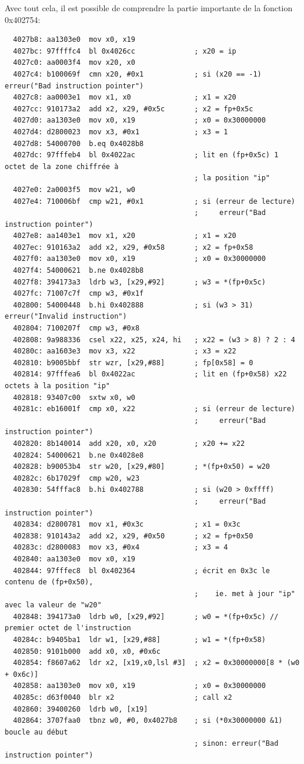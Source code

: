 \documentclass[a4paper,10pt]{article}
\begin{document}
Avec tout cela, il est possible de comprendre la partie importante de la fonction 0x402754:
\begin{verbatim}
  4027b8: aa1303e0  mov x0, x19
  4027bc: 97ffffc4  bl 0x4026cc              ; x20 = ip
  4027c0: aa0003f4  mov x20, x0
  4027c4: b100069f  cmn x20, #0x1            ; si (x20 == -1) erreur("Bad instruction pointer")
  4027c8: aa0003e1  mov x1, x0               ; x1 = x20
  4027cc: 910173a2  add x2, x29, #0x5c       ; x2 = fp+0x5c
  4027d0: aa1303e0  mov x0, x19              ; x0 = 0x30000000
  4027d4: d2800023  mov x3, #0x1             ; x3 = 1
  4027d8: 54000700  b.eq 0x4028b8
  4027dc: 97fffeb4  bl 0x4022ac              ; lit en (fp+0x5c) 1 octet de la zone chiffrée à
                                             ; la position "ip"
  4027e0: 2a0003f5  mov w21, w0
  4027e4: 710006bf  cmp w21, #0x1            ; si (erreur de lecture)
                                             ;     erreur("Bad instruction pointer")
  4027e8: aa1403e1  mov x1, x20              ; x1 = x20
  4027ec: 910163a2  add x2, x29, #0x58       ; x2 = fp+0x58
  4027f0: aa1303e0  mov x0, x19              ; x0 = 0x30000000
  4027f4: 54000621  b.ne 0x4028b8
  4027f8: 394173a3  ldrb w3, [x29,#92]       ; w3 = *(fp+0x5c)
  4027fc: 71007c7f  cmp w3, #0x1f
  402800: 54000448  b.hi 0x402888            ; si (w3 > 31) erreur("Invalid instruction")
  402804: 7100207f  cmp w3, #0x8
  402808: 9a988336  csel x22, x25, x24, hi   ; x22 = (w3 > 8) ? 2 : 4
  40280c: aa1603e3  mov x3, x22              ; x3 = x22
  402810: b9005bbf  str wzr, [x29,#88]       ; fp[0x58] = 0
  402814: 97fffea6  bl 0x4022ac              ; lit en (fp+0x58) x22 octets à la position "ip"
  402818: 93407c00  sxtw x0, w0
  40281c: eb16001f  cmp x0, x22              ; si (erreur de lecture)
                                             ;     erreur("Bad instruction pointer")
  402820: 8b140014  add x20, x0, x20         ; x20 += x22
  402824: 54000621  b.ne 0x4028e8
  402828: b90053b4  str w20, [x29,#80]       ; *(fp+0x50) = w20
  40282c: 6b17029f  cmp w20, w23
  402830: 54fffac8  b.hi 0x402788            ; si (w20 > 0xffff)
                                             ;     erreur("Bad instruction pointer")
  402834: d2800781  mov x1, #0x3c            ; x1 = 0x3c
  402838: 910143a2  add x2, x29, #0x50       ; x2 = fp+0x50
  40283c: d2800083  mov x3, #0x4             ; x3 = 4
  402840: aa1303e0  mov x0, x19
  402844: 97fffec8  bl 0x402364              ; écrit en 0x3c le contenu de (fp+0x50),
                                             ;    ie. met à jour "ip" avec la valeur de "w20"
  402848: 394173a0  ldrb w0, [x29,#92]       ; w0 = *(fp+0x5c) // premier octet de l'instruction
  40284c: b9405ba1  ldr w1, [x29,#88]        ; w1 = *(fp+0x58)
  402850: 9101b000  add x0, x0, #0x6c
  402854: f8607a62  ldr x2, [x19,x0,lsl #3]  ; x2 = 0x30000000[8 * (w0 + 0x6c)]
  402858: aa1303e0  mov x0, x19              ; x0 = 0x30000000
  40285c: d63f0040  blr x2                   ; call x2
  402860: 39400260  ldrb w0, [x19]
  402864: 3707faa0  tbnz w0, #0, 0x4027b8    ; si (*0x30000000 &1) boucle au début
                                             ; sinon: erreur("Bad instruction pointer")
\end{verbatim}
\end{document}
